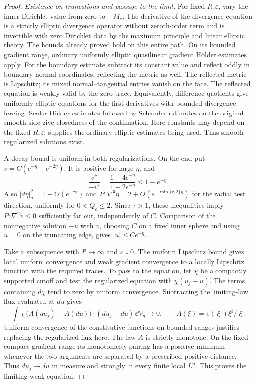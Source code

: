 \begin{proof}
\emph{Existence on truncations and passage to the limit.}
For fixed $R,\varepsilon$, vary the inner Dirichlet value from zero
to $-M_e$.  The derivative of the divergence equation is a strictly
elliptic divergence operator without zeroth-order term and is
invertible with zero Dirichlet data by the maximum principle and
linear elliptic theory.  The bounds already proved hold on this
entire path.  On its bounded gradient range, ordinary uniformly
elliptic quasilinear gradient H\"older estimates apply.  For the
boundary estimate subtract its constant value and reflect oddly in
boundary normal coordinates, reflecting the metric as well.  The
reflected metric is Lipschitz; its mixed normal--tangential entries
vanish on the face.  The reflected equation is weakly valid by the
zero trace.  Equivalently, difference quotients give uniformly
elliptic equations for the first derivatives with bounded divergence
forcing.  Scalar H\"older estimates followed by Schauder estimates
on the original smooth side give closedness of the continuation.
Here constants may depend on the fixed $R,\varepsilon$;
\citet{GT2001} supplies the ordinary elliptic estimates being used.
Thus smooth regularized solutions exist.

A decay bound is uniform in both regularizations.  On the end put
$v=C(e^{-\eta}-e^{-2\eta})$.  It is positive for large $\eta$, and
\[
 \frac{v''}{-v'}=\frac{1-4e^{-\eta}}{1-2e^{-\eta}}
 \le1-e^{-\eta}.
\]
Also $|d\eta|_g^2=1+O(e^{-\tau\eta})$ and
$P:\nabla^2\eta=2+O(e^{-\min\{\tau,2\}\eta})$ for the
radial test direction, uniformly for $0<Q_\varepsilon\le2$.
Since $\tau>1$, these inequalities imply
$P:\nabla^2v\le0$ sufficiently far out, independently of $C$.
Comparison of the nonnegative solution $-u$ with $v$, choosing $C$
on a fixed inner sphere and using $u=0$ on the truncating edge,
gives $|u|\le Ce^{-\eta}$.

Take a subsequence with $R\to\infty$ and $\varepsilon\downarrow0$.
The uniform Lipschitz bound gives local uniform convergence and weak
gradient convergence to a locally Lipschitz function with the required
traces.  To pass to the equation, let $\chi$ be a compactly supported
cutoff and test the regularized equation with $\chi(u_j-u)$.
The terms containing $d\chi$ tend to zero by uniform convergence.
Subtracting the limiting-law flux evaluated at $du$ gives
\[
 \int\chi\,
 \big(A(du_j)-A(du)\big)\cdot(du_j-du)\,\dd V_g\longrightarrow0,
 \qquad A(\xi)=e(|\xi|)\xi^\sharp/|\xi|.
\]
Uniform convergence of the constitutive functions on bounded ranges
justifies replacing the regularized flux here.  The law $A$ is
strictly monotone.  On the fixed compact gradient range its
monotonicity pairing has a positive minimum whenever the two
arguments are separated by a prescribed positive distance.
Thus $du_j\to du$ in measure and strongly in every finite local
$L^p$.  This proves the limiting weak equation.


\end{proof}
